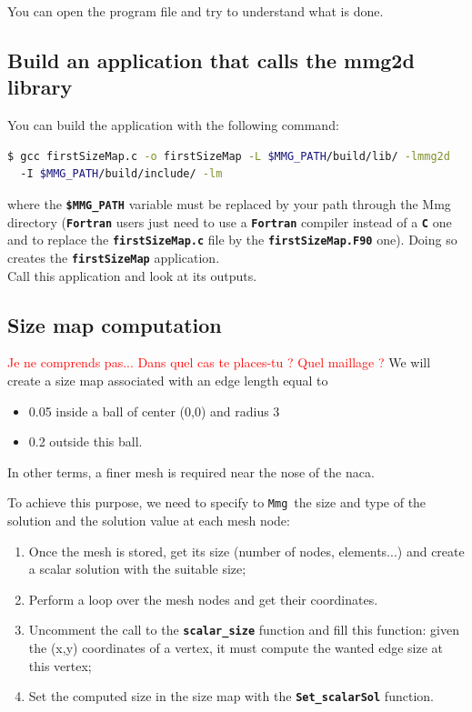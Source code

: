 \documentclass{article}
\newcommand{\ttb}[1]{\texttt{\textbf{#1}}}
\newcommand{\mmg}{\texttt{Mmg}}
\begin{document}
You can open the program file and try to understand what is done.

\subsection{Build an application that calls the mmg2d library}
You can build the application with the following command:
\begin{lstlisting}[language=bash]
$ gcc firstSizeMap.c -o firstSizeMap -L $MMG_PATH/build/lib/ -lmmg2d
  -I $MMG_PATH/build/include/ -lm
\end{lstlisting}
where the \ttb{\$MMG\_PATH} variable must be replaced by your path
through the Mmg directory (\ttb{Fortran} users just need to use a \ttb{Fortran} compiler
instead of a \ttb{C} one and to replace the \ttb{firstSizeMap.c} file by the
\ttb{firstSizeMap.F90} one). Doing so creates the \ttb{firstSizeMap} application.\\

Call this application and look at its outputs.

\subsection{Size map computation}

\textcolor{red}{Je ne comprends pas... Dans quel cas te places-tu ? Quel maillage ?}
We will create a size map associated with an edge length equal to 
\begin{itemize}
\item 0.05 inside a
ball of center (0,0) and radius 3 
\item 0.2 outside this ball.
\end{itemize}
In other terms, a finer mesh is required near the nose of the naca. 

To achieve this purpose, we need to
specify to \mmg\ the size and type of the solution and
the solution value at each mesh node:
\begin{enumerate}
\item Once the mesh is stored, get its size (number of nodes,
  elements...) and create a scalar solution with the suitable size;
\item Perform a loop over the mesh nodes and get their coordinates.
\item Uncomment the call to the \ttb{scalar\_size} function and fill
  this function: given the (x,y) coordinates of a vertex, it must
  compute the wanted edge size at this vertex;
\item Set the computed size in the size map with the \ttb{Set\_scalarSol} function.\\
\end{enumerate}
\end{document}
